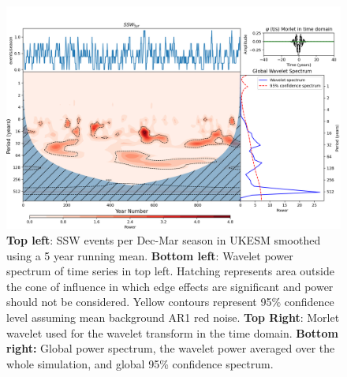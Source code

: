 \begin{figure}[h!]
\begin{center}
\noindent\includegraphics[width = 0.8\linewidth]{Figures/Figures-origins/SSW_wavelet_5_yr_wavelet.png}
\caption{\textbf{Top left}: SSW events per Dec-Mar season in UKESM smoothed using a 5 year running mean. \textbf{Bottom left}: Wavelet power spectrum of time series in top left. Hatching represents area outside the cone of influence in which edge effects are significant and power should not be considered. Yellow contours represent 95\% confidence level assuming mean background AR1 red noise. \textbf{Top Right}: Morlet wavelet used for the wavelet transform in the time domain. \textbf{Bottom right:} Global power spectrum, the wavelet power averaged over the whole simulation, and global 95\% confidence spectrum.}
\label{fig:SSW_series_5yr_wavelet}
\end{center}
\end{figure}

